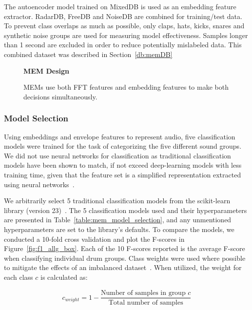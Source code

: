 \documentclass[\main/thesis.tex]{subfiles}
\begin{document}
The autoencoder model trained on MixedDB is used as an embedding feature extractor. RadarDB, FreeDB and NoiseDB are combined for training/test data. To prevent class overlaps as much as possible, only claps, hats, kicks, snares and synthetic noise groups are used for measuring model effectiveness. Samples longer than 1 second are excluded in order to reduce potentially mislabeled data. This combined dataset was described in Section~\ref{db:memDB}

\begin{figure}[tbp]
    \begin{center}
    \textbf{MEM Design}
    \end{center}
    \caption{MEMs use both FFT features and embedding features to make both decisions simultaneously. }
\label{fig:TPE_design}
\end{figure}

\subsubsection{Model Selection}
Using embeddings and envelope features to represent audio, five classification models were trained for the task of categorizing the five different sound groups. We did not use neural networks for classification as traditional classification models have been shown to match, if not exceed deep-learning models with less training time, given that the feature set is a simplified representation extracted using neural networks~\cite{notley2018examining}.

 We arbitrarily select 5 traditional classification models from the scikit-learn library (version 23)~\cite{pedregosa2011scikit}. The 5 classification models used and their hyperparameters are presented in Table~\ref{table:mem_model_selection}, and any unmentioned hyperparameters are set to the library's defaults. To compare the models, we conducted a 10-fold cross validation and plot the F-scores in Figure~\ref{fig:f1_allg_box}. Each of the 10 F-scores reported is the average F-score when classifying individual drum groups. Class weights were used where possible to mitigate the effects of an imbalanced dataset~\cite{provost2000machine,chawla2004special}. When utilized, the weight for each class $c$ is calculated as:

\begin{subequations}
    \begin{align*}
    c_{weight} = 1-\dfrac{\text{Number of samples in group $c$} }{\text{Total number of samples}}
    \end{align*}
\end{subequations}
\end{document}
